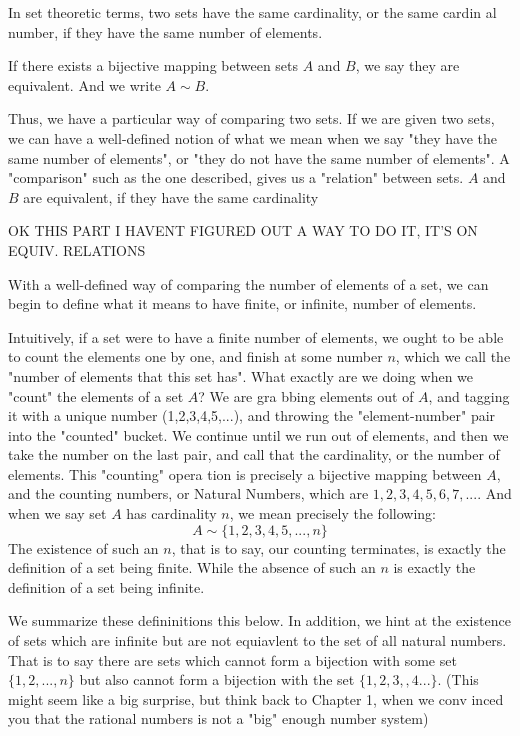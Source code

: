 \documentclass[../../templates/section]{subfiles}
\begin{document}
In set theoretic terms, two sets have the same cardinality, or the same cardin
al number, if they have the same number of elements.

\begin{definition}
If there exists a bijective mapping between sets $A$ and $B$, we say they are 
equivalent. And we write $A\sim B$.
\end{definition}

Thus, we have a particular way of comparing two sets. If we are given two sets, 
we can have a well-defined notion of what we mean when we say 
"they have the same number of elements", or 
"they do not have the same number of elements". 
A "comparison" such as the one described, gives us a "relation" between sets. 
$A$ and $B$ are equivalent, if they have the same cardinality

OK THIS PART I HAVENT FIGURED OUT A WAY TO DO IT, IT'S ON EQUIV. RELATIONS

With a well-defined way of comparing the number of elements of a set, we can
 begin to define what it means to have finite, or infinite, number of elements.

 Intuitively, if a set were to have a finite number of elements, we ought to be 
 able to count the elements one by one, and finish at some number $n$, which we
  call the "number of elements that this set has". 
What exactly are we doing when we "count" the elements of a set $A$? We are gra
bbing elements out of $A$, and tagging it with a unique number (1,2,3,4,5,...), 
and throwing the "element-number" pair into the "counted" bucket. We continue 
until we run out of elements, and then we take the number on the last pair,
and call that the cardinality, or the number of elements. This "counting" opera
tion is precisely a bijective mapping between $A$, and the counting numbers, or
Natural Numbers, which are $1,2,3,4,5,6,7,...$. And when we say set $A$ has 
cardinality $n$, we mean precisely the following:
\[
A\sim\{1,2,3,4,5,...,n\}
\]
The existence of such an $n$, that is to say, our counting terminates, is exactly 
the definition of a set being finite. While the absence of such an $n$ is exactly 
the definition of a set being infinite. 

We summarize these defininitions this below. In addition, we hint at the 
existence of sets which are infinite but are not equiavlent to the set of all 
natural numbers. That 
is to say there are sets which cannot form a bijection with some set 
$\{1,2,...,n\}$ but also cannot form a bijection with the set $\{1,2,3,,4...\}$. 
(This might seem like a big surprise, but think back to Chapter 1, when we conv
inced you that the rational numbers is not a "big" enough number system)
\end{document}
